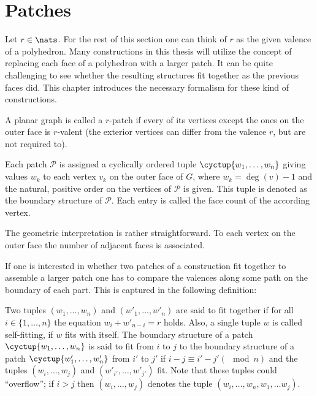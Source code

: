 \section{Patches}

Let $r \in \nats$. For the rest of this section one can think of $r$ as the given valence of a polyhedron. Many constructions in this thesis will utilize the concept of replacing each face of a polyhedron with a larger patch. It can be quite challenging to see whether the resulting structures fit together as the previous faces did. This chapter introduces the necessary formalism for these kind of constructions.

\begin{definition}[Patch] A planar graph is called a $r$-patch if every of its vertices except the ones on the outer face is $r$-valent (the exterior vertices can differ from the valence $r$, but are not required to).
\end{definition}

\begin{definition} Each patch $\mathcal{P}$ is assigned a cyclically ordered tuple $\cyctup{w_1, \dots, w_n}$ giving values $w_k$ to each vertex $v_k$ on the outer face of $G$, where $w_k = \deg(v) - 1$ and the natural, positive order on the vertices of $\mathcal{P}$ is given. This tuple is denoted as the boundary structure of $\mathcal{P}$. Each entry is called the face count of the according vertex.
\end{definition}

The geometric interpretation is rather straightforward. To each vertex on the outer face the number of adjacent faces is associated.

If one is interested in whether two patches of a construction fit together to assemble a larger patch one has to compare the valences along some path on the boundary of each part. This is captured in the following definition:
\begin{definition}
  Two tuples $(w_1, \dots, w_n)$ and $(w'_1, \dots, w'_n)$ are said to fit together if for all $i \in \{1, \dots, n \}$ the equation $w_i + w'_{n-i} = r$ holds. Also, a single tuple $w$ is called self-fitting, if $w$ fits with itself. The boundary structure of a patch $\cyctup{w_1, \dots, w_n}$ is said to fit from $i$ to $j$ to the boundary structure of a patch $\cyctup{w'_1, \dots, w'_n}$ from $i'$ to $j'$ if $i-j \equiv i' -j' (\mod n)$ and the tuples $(w_i, \dots, w_j)$ and $(w'_{i'}, \dots, w'_{j'})$ fit. Note that these tuples could ``overflow''; if $i > j$ then $(w_i, \dots, w_j)$ denotes the tuple $(w_i, \dots, w_n, w_1, \dots w_j)$.
\end{definition}

